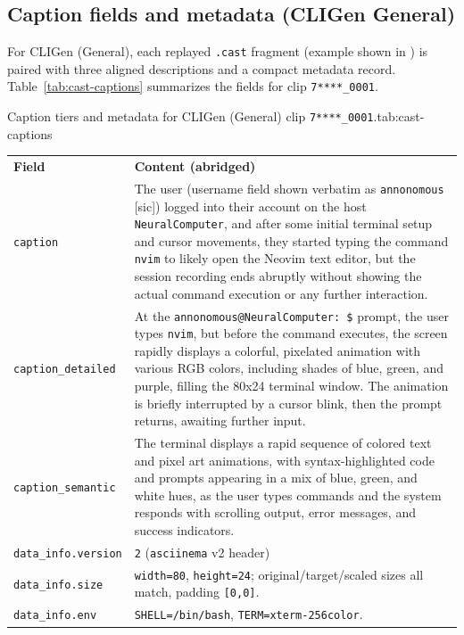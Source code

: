 \subsection{Caption fields and metadata (CLIGen General)}
For CLIGen (General), each replayed \texttt{.cast} fragment (example shown in ) is paired with three aligned descriptions and a compact metadata record.
Table~\ref{tab:cast-captions} summarizes the fields for clip \texttt{7****\_0001}.

\begin{smallschemetable}{Caption tiers and metadata for CLIGen (General) clip \texttt{7****\_0001}.}{tab:cast-captions}
  \begin{tabularx}{\linewidth}{@{}l X@{}}
    \toprule
    \rowcolor{metablue!16}\textbf{Field} & \textbf{Content (abridged)} \\
    \texttt{caption} &
      The user (username field shown verbatim as \texttt{annonomous} [sic]) logged into their account on the host \texttt{NeuralComputer}, and after some initial terminal setup and cursor movements,
      they started typing the command \texttt{nvim} to likely open the Neovim text editor, but the session recording ends abruptly without showing the actual command execution or any further interaction. \\
    \texttt{caption\_detailed} &
      At the \texttt{annonomous@NeuralComputer:~\$} prompt, the user types \texttt{nvim}, but before the command executes, the screen rapidly displays a colorful,
      pixelated animation with various RGB colors, including shades of blue, green, and purple, filling the 80x24 terminal window.
      The animation is briefly interrupted by a cursor blink, then the prompt returns, awaiting further input. \\
    \texttt{caption\_semantic} &
      The terminal displays a rapid sequence of colored text and pixel art animations, with syntax-highlighted code and prompts appearing in a mix of blue, green,
      and white hues, as the user types commands and the system responds with scrolling output, error messages, and success indicators. \\
    \midrule
    \texttt{data\_info.version} & \texttt{2} (\texttt{asciinema} v2 header) \\
    \texttt{data\_info.size} & \texttt{width=80}, \texttt{height=24}; original/target/scaled sizes all match, padding \texttt{[0,0]}. \\
    \texttt{data\_info.env} & \texttt{SHELL=/bin/bash}, \texttt{TERM=xterm-256color}. \\

\end{tabularx}
\end{smallschemetable}
